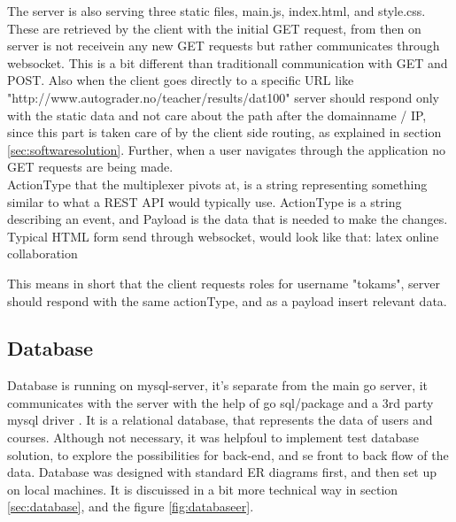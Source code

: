 The server is also serving three static files, main.js, index.html, and style.css. These are retrieved by the client with the initial GET request, from then on server is not receivein any new GET requests but rather communicates through websocket. This is a bit different than traditionall communication with GET and POST. Also when the client goes directly to a specific URL like "http://www.autograder.no/teacher/results/dat100" server should respond only with the static data and not care about the path after the domainname / IP, since this part is taken care of by the client side routing, as explained in section \ref{sec:softwaresolution}. Further, when a user navigates through the application no GET requests are being made.
\\ActionType that the multiplexer pivots at, is a string representing something similar to what a REST API would typically use. ActionType is a string describing an event, and Payload is the data that is needed to make the changes. Typical HTML form send through websocket, would look like that:
latex online collaboration


This means in short that the client requests roles for username "tokams", server should respond with the same actionType, and as a payload insert relevant data.

\subsection {Database}
Database is running on mysql-server, it's separate from the main go server, it communicates with the server with the help of go sql/package and a 3rd party mysql driver \cite{ziutek}. It is a relational database, that represents the data of users and courses. Although not necessary, it was helpfoul to implement test database solution, to explore the possibilities for back-end, and se front to back flow of the data. Database was designed with standard ER diagrams first, and then set up on local machines.
It is discuissed in a bit more technical way in section \ref{sec:database}, and the figure \ref{fig:databaseer}.

